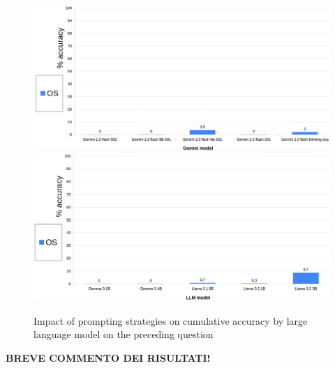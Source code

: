 \documentclass[12pt]{article}
\begin{document}
\begin{figure}[H]
    \centering
            \includegraphics[width=1\textwidth]{q203Gemini.png}
            \includegraphics[width=1\textwidth]{q203Other.png}
    \caption[Accuracy on Question 9 by LLM]{Impact of prompting strategies on cumulative accuracy by large language model on the preceding question}
    \end{figure} 
\textbf{BREVE COMMENTO DEI RISULTATI!}

\vspace{1cm}

\end{document}
